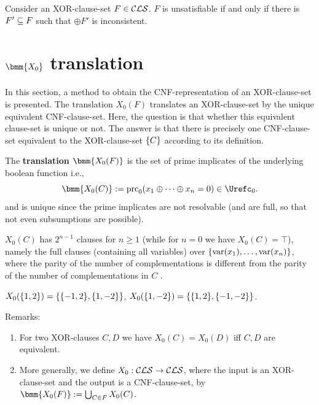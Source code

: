 \documentclass[]{book}
\begin{document}
\begin{lem}\label{lem:characimplxor}
  \cite{h8} Consider an XOR-clause-set $F \in \mathcal{CLS}$. $F$ is unsatisfiable if and only if there is $F' \subseteq F$ such that $\oplus F'$ is inconsistent.

\end{lem}
\section{$\bmm{X_0}$ translation}
\label{sec:x0}

In this section, a method to obtain the CNF-representation of an XOR-clause-set is presented. The translation $X_0(F)$ 
translates an XOR-clause-set by the unique equivalent CNF-clause-set. Here, the question is that whether this equivalent clause-set 
is unique or not. The answer is that there is precisely one CNF-clause-set equivalent to the XOR-clause-set $\{ C \}$ according 
to its definition.

\begin{defi}\label{def:x0def} 
The \textbf{translation} $\bmm{X_0(F)}$ is the set of prime implicates of the underlying boolean function i.e., 
\begin{displaymath}
  \bmm{X_0(C)} := \primec_0(x_1 \oplus \dots \oplus x_n = 0) \in \Urefc_0.
\end{displaymath}
and is unique since the prime implicates are not resolvable (and are full, 
so that not even subsumptions are possible).

$X_0(C)$ has $2^{n-1}$ clauses for $n \ge 1$ (while for $n=0$ we have $X_0(C) = \top$), namely the full clauses (containing all variables) 
over $\{ \operatorname{var}(x_1),\dots,\operatorname{var}(x_n) \}$, where the parity of the number of complementations is different from the parity of the number of 
complementations in $C$ \cite{h8}.
\end{defi}

\begin{examp}\label{exp:X0}
  \cite{h8} $X_0(\{ 1,2 \}) = \{ \{ -1,2 \},\{ 1,-2 \} \}$, $X_0(\{ 1,-2 \}) = \{ \{ 1,2 \},\{ -1,-2 \} \}$.
\end{examp}

Remarks:
\begin{enumerate}
  \item For two XOR-clauses $C, D$ we have $X_0(C) = X_0(D)$ iff $C, D$ are equivalent.
  \item More generally, we define $X_0: \mathcal{CLS} \rightarrow \mathcal{CLS}$, where the input is an XOR-clause-set and the output is a CNF-clause-set, 
  by $\bmm{X_0(F)} := \bc_{C \in F} X_0(C)$.
  
\end{enumerate}  
\end{document}
